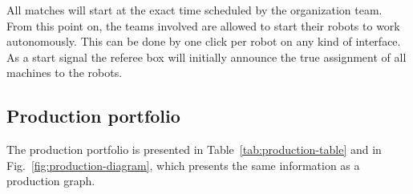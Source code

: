 \documentclass[12pt,twoside]{article}
\newcommand{\mytable}[1]{\savebox{\myt}{#1}\tikz\node[fill=gray!25!white]{\usebox{\myt}};}
\begin{document}
All matches will start at the exact time scheduled by the organization
team. From this point on, the teams involved are allowed to start
their robots to work autonomously. This can be done by one click per
robot on any kind of interface. 
%
As a start signal the referee box will initially announce the true
assignment of all machines to the robots.



\subsection{Production portfolio} \label{sec:prodportfolio}

The production portfolio is presented in
Table~\ref{tab:production-table} and in
Fig.~\ref{fig:production-diagram}, which presents the same information
as a production graph.







\end{document}
